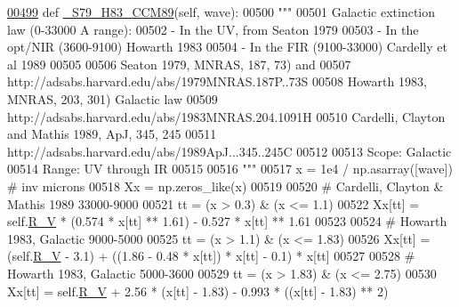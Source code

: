 \begin{DoxyVerb}
\begin{DoxyCode}
\hypertarget{classpyneb_1_1extinction_1_1red__corr_1_1_red_corr_l00499}{}\hyperlink{classpyneb_1_1extinction_1_1red__corr_1_1_red_corr_a758a99903861c8b015cc2074766ad811}{00499}     \textcolor{keyword}{def }\hyperlink{classpyneb_1_1extinction_1_1red__corr_1_1_red_corr_a758a99903861c8b015cc2074766ad811}{\_S79\_H83\_CCM89}(self, wave):
00500         \textcolor{stringliteral}{"""}
00501 \textcolor{stringliteral}{        Galactic extinction law (0-33000 A range):}
00502 \textcolor{stringliteral}{        - In the UV, from Seaton 1979}
00503 \textcolor{stringliteral}{        - In the opt/NIR (3600-9100) Howarth 1983}
00504 \textcolor{stringliteral}{        - In the FIR (9100-33000) Cardelly et al 1989}
00505 \textcolor{stringliteral}{        }
00506 \textcolor{stringliteral}{        Seaton 1979, MNRAS, 187, 73) and }
00507 \textcolor{stringliteral}{        http://adsabs.harvard.edu/abs/1979MNRAS.187P..73S}
00508 \textcolor{stringliteral}{        Howarth 1983, MNRAS, 203, 301) Galactic law}
00509 \textcolor{stringliteral}{        http://adsabs.harvard.edu/abs/1983MNRAS.204.1091H}
00510 \textcolor{stringliteral}{        Cardelli, Clayton and Mathis 1989, ApJ, 345, 245}
00511 \textcolor{stringliteral}{        http://adsabs.harvard.edu/abs/1989ApJ...345..245C}
00512 \textcolor{stringliteral}{        }
00513 \textcolor{stringliteral}{        Scope: Galactic}
00514 \textcolor{stringliteral}{        Range: UV through IR}
00515 \textcolor{stringliteral}{        }
00516 \textcolor{stringliteral}{        """}
00517         x = 1e4 / np.asarray([wave]) \textcolor{comment}{# inv microns}
00518         Xx = np.zeros\_like(x)
00519 
00520         \textcolor{comment}{# Cardelli, Clayton & Mathis 1989 33000-9000}
00521         tt = (x > 0.3) & (x <= 1.1)
00522         Xx[tt] = self.\hyperlink{classpyneb_1_1extinction_1_1red__corr_1_1_red_corr_a4696ecdd84c912c20e6aa19b1573e875}{R\_V} * (0.574 * x[tt] ** 1.61) - 0.527 * x[tt] ** 1.61
00523         
00524         \textcolor{comment}{# Howarth 1983, Galactic 9000-5000}
00525         tt = (x > 1.1) & (x <= 1.83)
00526         Xx[tt] = (self.\hyperlink{classpyneb_1_1extinction_1_1red__corr_1_1_red_corr_a4696ecdd84c912c20e6aa19b1573e875}{R\_V} - 3.1) + ((1.86 - 0.48 * x[tt]) * x[tt] - 0.1) * x[tt]
00527         
00528         \textcolor{comment}{# Howarth 1983, Galactic 5000-3600}
00529         tt = (x > 1.83) & (x <= 2.75)
00530         Xx[tt] = self.\hyperlink{classpyneb_1_1extinction_1_1red__corr_1_1_red_corr_a4696ecdd84c912c20e6aa19b1573e875}{R\_V} + 2.56 * (x[tt] - 1.83) - 0.993 * ((x[tt] - 1.83) ** 2)

\end{DoxyCode}
\end{DoxyVerb}
